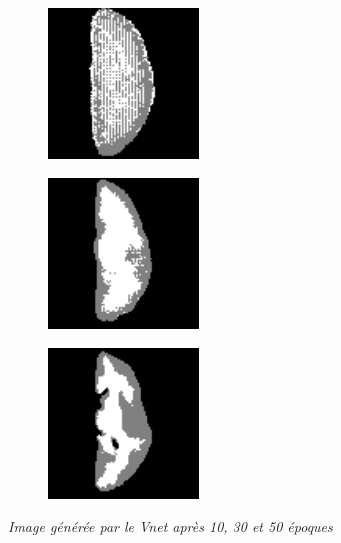 \documentclass[12pt, oneside, a4paper, titlepage]{article}
\begin{document}
\begin{figure}[H]
\centering
\begin{subfigure}{.2\textwidth}
  \includegraphics[width=4cm, height=4cm]{gw1_10.png}
  \label{fig:sub1}
\end{subfigure}%
\begin{subfigure}{.2\textwidth}
  \includegraphics[width=4cm, height=4cm]{gw1_70.png}
  \label{fig:sub2}
\end{subfigure}
\begin{subfigure}{.2\textwidth}
  \includegraphics[width=4cm, height=4cm]{gw4_130.png}
  \label{fig:sub2}
\end{subfigure}
\caption{\textit{Image générée par le Vnet après 10, 30 et 50 époques}}
\label{fig:res_Vnet}
\end{figure}


\vspace{5mm}
\end{document}
